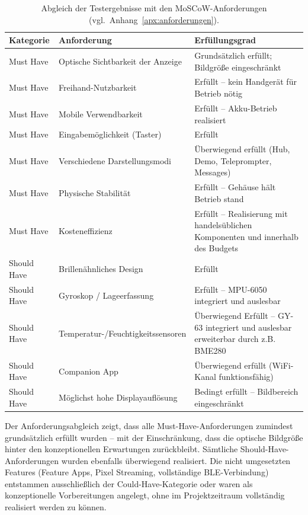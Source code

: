 \begin{table}[htbp]
  \centering
  \caption{Abgleich der Testergebnisse mit den MoSCoW-Anforderungen
           (vgl.~Anhang~\ref{apx:anforderungen}).}
  \label{tab:anforderungsabgleich}
  \begin{tabularx}{\textwidth}{@{} l l X @{}}
    \toprule
    \textbf{Kategorie} & \textbf{Anforderung} & \textbf{Erfüllungsgrad} \\
    \midrule
    Must Have & Optische Sichtbarkeit der Anzeige &
      Grundsätzlich erfüllt; Bildgröße eingeschränkt \\
    Must Have & Freihand-Nutzbarkeit &
      Erfüllt -- kein Handgerät für Betrieb nötig \\
    Must Have & Mobile Verwendbarkeit &
      Erfüllt -- Akku-Betrieb realisiert \\
    Must Have & Eingabemöglichkeit (Taster) &
      Erfüllt \\
    Must Have & Verschiedene Darstellungsmodi &
      Überwiegend erfüllt (Hub, Demo, Teleprompter, Messages) \\
    Must Have & Physische Stabilität &
      Erfüllt -- Gehäuse hält Betrieb stand \\
    Must Have & Kosteneffizienz &
      Erfüllt -- Realisierung mit handelsüblichen Komponenten und innerhalb des Budgets \\
    \midrule
    Should Have & Brillenähnliches Design &
      Erfüllt \\
    Should Have & Gyroskop / Lageerfassung &
      Erfüllt -- MPU-6050 integriert und auslesbar \\
    Should Have & Temperatur-/Feuchtigkeitssensoren &
      Überwiegend Erfüllt -- GY-63 integriert und auslesbar erweiterbar durch z.B. BME280 \\
    Should Have & Companion App &
      Überwiegend erfüllt (WiFi-Kanal funktionsfähig) \\
    Should Have & Möglichst hohe Displayauflösung &
      Bedingt erfüllt -- Bildbereich eingeschränkt \\
    \bottomrule
  \end{tabularx}
\end{table}

Der Anforderungsabgleich zeigt, dass alle Must-Have-Anforderungen zumindest
grundsätzlich erfüllt wurden -- mit der Einschränkung, dass die optische Bildgröße
hinter den konzeptionellen Erwartungen zurückbleibt.
Sämtliche Should-Have-Anforderungen wurden ebenfalls überwiegend realisiert.
Die nicht umgesetzten Features (Feature Apps, Pixel Streaming, vollständige
BLE-Verbindung) entstammen ausschließlich der Could-Have-Kategorie oder waren
als konzeptionelle Vorbereitungen angelegt, ohne im Projektzeitraum vollständig
realisiert werden zu können.